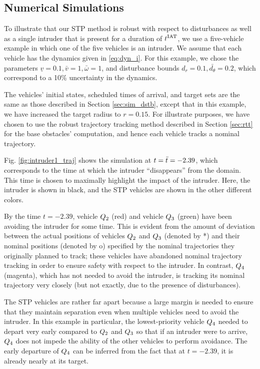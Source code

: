 \subsection{Numerical Simulations \label{sec:intruder_results}}
To illustrate that our STP method is robust with respect to disturbances as well as a single intruder that is present for a duration of $t^\text{IAT}$, we use a five-vehicle example in which one of the five vehicles is an intruder. We assume that each vehicle has the dynamics given in \eqref{eq:dyn_i}. For this example, we chose the parameters $\underline{v} = 0.1, \bar{v} = 1, \bar\omega = 1$, and disturbance bounds $d_{r} = 0.1, \bar{d_{\theta}} = 0.2$, which correspond to a 10\% uncertainty in the dynamics. 

The vehicles' initial states, scheduled times of arrival, and target sets are the same as those described in Section \ref{sec:sim_dstb}, except that in this example, we have increased the target radius to $r=0.15$. For illustrate purposes, we have chosen to use the robust trajectory tracking method described in Section \ref{sec:rtt} for the base obstacles' computation, and hence each vehicle tracks a nominal trajectory.

Fig. \ref{fig:intruder1_traj} shows the simulation at $t = \bar{t} = -2.39$, which corresponds to the time at which the intruder ``disappears'' from the domain. This time is chosen to maximally highlight the impact of the intruder. Here, the intruder is shown in black, and the STP vehicles are shown in the other different colors.

By the time $t = -2.39$, vehicle $Q_2$ (red) and vehicle $Q_3$ (green) have been avoiding the intruder for some time. This is evident from the amount of deviation between the actual positions of vehicles $Q_2$ and $Q_3$ (denoted by *) and their nominal positions (denoted by o) specified by the nominal trajectories they originally planned to track; these vehicles have abandoned nominal trajectory tracking in order to ensure safety with respect to the intruder. In contrast, $Q_4$ (magenta), which has not needed to avoid the intruder, is tracking its nominal trajectory very closely (but not exactly, due to the presence of disturbances).

The STP vehicles are rather far apart because a large margin is needed to ensure that they maintain separation even when multiple vehicles need to avoid the intruder. In this example in particular, the lowest-priority vehicle $Q_4$ needed to depart very early compared to $Q_2$ and $Q_3$ so that if an intruder were to arrive, $Q_4$ does not impede the ability of the other vehicles to perform avoidance. The early departure of $Q_4$ can be inferred from the fact that at $t=-2.39$, it is already nearly at its target.

